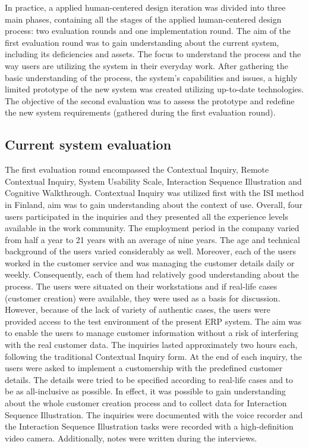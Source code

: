 \documentclass[12pt,a4paper,oneside,pdftex]{report}
\begin{document}
In practice, a applied human-centered design iteration was divided into three main phases, containing all the stages of the applied human-centered design process: two evaluation rounds and one implementation round. The aim of the first evaluation round was to gain understanding about the current system, including its deficiencies and assets. The focus to understand the process and the way users are utilizing the system in their everyday work. After gathering the basic understanding of the process, the system's capabilities and issues, a highly limited prototype of the new system was created utilizing up-to-date technologies. The objective of the second evaluation was to assess the prototype and redefine the new system requirements (gathered during the first evaluation round). 

\subsection{Current system evaluation}
\label{sec:firstiteration}

The first evaluation round encompassed the Contextual Inquiry, Remote Contextual Inquiry, System Usability Scale, Interaction Sequence Illustration and Cognitive Walkthrough. Contextual Inquiry was utilized first with the ISI method in Finland, aim was to gain understanding about the context of use. Overall, four users participated in the inquiries and they presented all the experience levels available in the work community. The employment period in the company varied from half a year to 21 years with an average of nine years. The age and technical background of the users varied considerably as well. Moreover, each of the users worked in the customer service and was managing the customer details daily or weekly. Consequently, each of them had relatively good understanding about the process. The users were situated on their workstations and if real-life cases (customer creation) were available, they were used as a basis for discussion. However, because of the lack of variety of authentic cases, the users were provided access to the test environment of the present ERP system. The aim was to enable the users to manage customer information without a risk of interfering with the real customer data. The inquiries lasted approximately two hours each, following  the traditional Contextual Inquiry form. At the end of each inquiry, the users were asked to implement a customership with the predefined customer details. The details were tried to be specified according to real-life cases and to be as all-inclusive as possible. In effect, it was possible to gain understanding about the whole customer creation process and to collect data for Interaction Sequence Illustration. The inquiries were documented with the voice recorder and the Interaction Sequence Illustration tasks were recorded with a high-definition video camera. Additionally, notes were written during the interviews.
\end{document}
